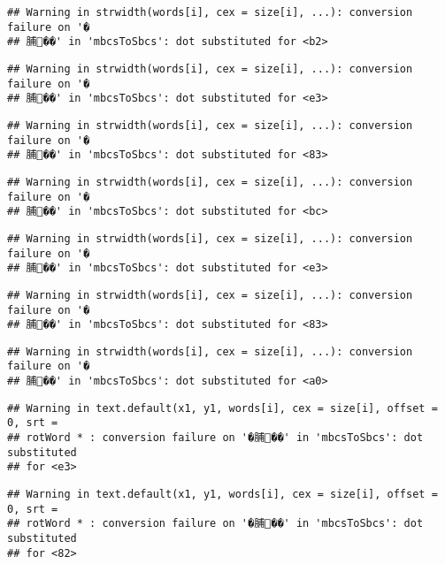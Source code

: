 \documentclass[]{article}
\begin{document}
\begin{verbatim}
## Warning in strwidth(words[i], cex = size[i], ...): conversion failure on '�
## 脯��' in 'mbcsToSbcs': dot substituted for <b2>
\end{verbatim}

\begin{verbatim}
## Warning in strwidth(words[i], cex = size[i], ...): conversion failure on '�
## 脯��' in 'mbcsToSbcs': dot substituted for <e3>
\end{verbatim}

\begin{verbatim}
## Warning in strwidth(words[i], cex = size[i], ...): conversion failure on '�
## 脯��' in 'mbcsToSbcs': dot substituted for <83>
\end{verbatim}

\begin{verbatim}
## Warning in strwidth(words[i], cex = size[i], ...): conversion failure on '�
## 脯��' in 'mbcsToSbcs': dot substituted for <bc>
\end{verbatim}

\begin{verbatim}
## Warning in strwidth(words[i], cex = size[i], ...): conversion failure on '�
## 脯��' in 'mbcsToSbcs': dot substituted for <e3>
\end{verbatim}

\begin{verbatim}
## Warning in strwidth(words[i], cex = size[i], ...): conversion failure on '�
## 脯��' in 'mbcsToSbcs': dot substituted for <83>
\end{verbatim}

\begin{verbatim}
## Warning in strwidth(words[i], cex = size[i], ...): conversion failure on '�
## 脯��' in 'mbcsToSbcs': dot substituted for <a0>
\end{verbatim}

\begin{verbatim}
## Warning in text.default(x1, y1, words[i], cex = size[i], offset = 0, srt =
## rotWord * : conversion failure on '�脯��' in 'mbcsToSbcs': dot substituted
## for <e3>
\end{verbatim}

\begin{verbatim}
## Warning in text.default(x1, y1, words[i], cex = size[i], offset = 0, srt =
## rotWord * : conversion failure on '�脯��' in 'mbcsToSbcs': dot substituted
## for <82>
\end{verbatim}
\end{document}
